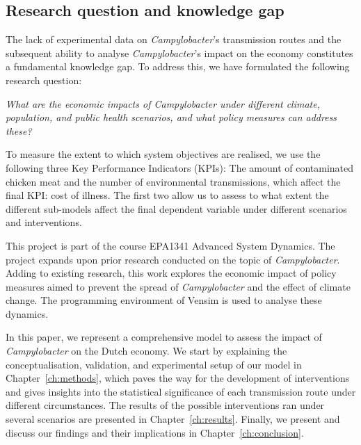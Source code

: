 
\subsection*{Research question and knowledge gap}

The lack of experimental data on \textit{Campylobacter}’s transmission routes and the subsequent ability to analyse \textit{Campylobacter}’s impact on the economy constitutes a fundamental knowledge gap. To address this, we have formulated the following research question:
\begin{center}\textit{\textcolor{NiceBlue}{
What are the economic impacts of Campylobacter under different climate, population, and public health scenarios, and what policy measures can address these? 
}}
\end{center}
To measure the extent to which system objectives are realised, we use the following three Key Performance Indicators (KPIs): The amount of contaminated chicken meat and the number of environmental transmissions, which affect the final KPI: cost of illness. The first two allow us to assess to what extent the different sub-models affect the final dependent variable under different scenarios and interventions.

This project is part of the course EPA1341 Advanced System Dynamics. The project expands upon prior research conducted on the topic of \textit{Campylobacter}. Adding to existing research, this work explores the economic impact of policy measures aimed to prevent the spread of  \textit{Campylobacter} and the effect of climate change. The programming environment of Vensim is used to analyse these dynamics. 

In this paper, we represent a comprehensive model to assess the impact of \textit{Campylobacter} on the Dutch economy. We start by explaining the conceptualisation, validation, and experimental setup of our model in Chapter~\ref{ch:methods}, which paves the way for the development of interventions and gives insights into the statistical significance of each transmission route under different circumstances. The results of the possible interventions ran under several scenarios are presented in Chapter~\ref{ch:results}. Finally, we present and discuss our findings and their implications in Chapter~\ref{ch:conclusion}.


